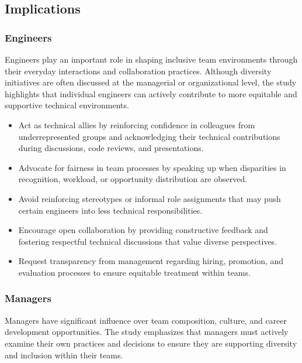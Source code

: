 \subsection{Implications}
\subsubsection{Engineers}

Engineers play an important role in shaping inclusive team environments through their everyday interactions and collaboration practices. Although diversity initiatives are often discussed at the managerial or organizational level, the study highlights that individual engineers can actively contribute to more equitable and supportive technical environments.

\begin{itemize}
    \item Act as technical allies by reinforcing confidence in colleagues from underrepresented groups and acknowledging their technical contributions during discussions, code reviews, and presentations.
    \item Advocate for fairness in team processes by speaking up when disparities in recognition, workload, or opportunity distribution are observed.
    \item Avoid reinforcing stereotypes or informal role assignments that may push certain engineers into less technical responsibilities.
    \item Encourage open collaboration by providing constructive feedback and fostering respectful technical discussions that value diverse perspectives.
    \item Request transparency from management regarding hiring, promotion, and evaluation processes to ensure equitable treatment within teams.
\end{itemize}

\subsubsection{Managers}

Managers have significant influence over team composition, culture, and career development opportunities. The study emphasizes that managers must actively examine their own practices and decisions to ensure they are supporting diversity and inclusion within their teams.


